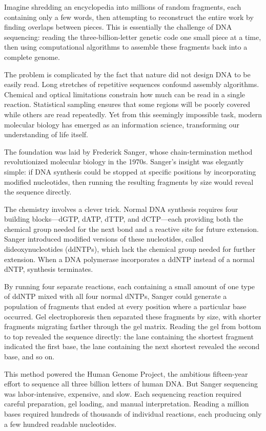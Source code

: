 Imagine shredding an encyclopedia into millions of random fragments, each containing only a few words, then attempting to reconstruct the entire work by finding overlaps between pieces. This is essentially the challenge of DNA sequencing: reading the three-billion-letter genetic code one small piece at a time, then using computational algorithms to assemble these fragments back into a complete genome.

The problem is complicated by the fact that nature did not design DNA to be easily read. Long stretches of repetitive sequences confound assembly algorithms. Chemical and optical limitations constrain how much can be read in a single reaction. Statistical sampling ensures that some regions will be poorly covered while others are read repeatedly. Yet from this seemingly impossible task, modern molecular biology has emerged as an information science, transforming our understanding of life itself.

The foundation was laid by Frederick Sanger, whose chain-termination method revolutionized molecular biology in the 1970s. Sanger's insight was elegantly simple: if DNA synthesis could be stopped at specific positions by incorporating modified nucleotides, then running the resulting fragments by size would reveal the sequence directly.

The chemistry involves a clever trick. Normal DNA synthesis requires four building blocks—dGTP, dATP, dTTP, and dCTP—each providing both the chemical group needed for the next bond and a reactive site for future extension. Sanger introduced modified versions of these nucleotides, called dideoxynucleotides (ddNTPs), which lack the chemical group needed for further extension. When a DNA polymerase incorporates a ddNTP instead of a normal dNTP, synthesis terminates.

By running four separate reactions, each containing a small amount of one type of ddNTP mixed with all four normal dNTPs, Sanger could generate a population of fragments that ended at every position where a particular base occurred. Gel electrophoresis then separated these fragments by size, with shorter fragments migrating farther through the gel matrix. Reading the gel from bottom to top revealed the sequence directly: the lane containing the shortest fragment indicated the first base, the lane containing the next shortest revealed the second base, and so on.

This method powered the Human Genome Project, the ambitious fifteen-year effort to sequence all three billion letters of human DNA. But Sanger sequencing was labor-intensive, expensive, and slow. Each sequencing reaction required careful preparation, gel loading, and manual interpretation. Reading a million bases required hundreds of thousands of individual reactions, each producing only a few hundred readable nucleotides.

